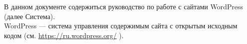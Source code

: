\Introduction

В данном документе содержиться руководство по работе с сайтами WordPress (далее Система).\\

WordPress — система управления содержимым сайта с открытым исходным кодом (см. \url{https://ru.wordpress.org/} ).


